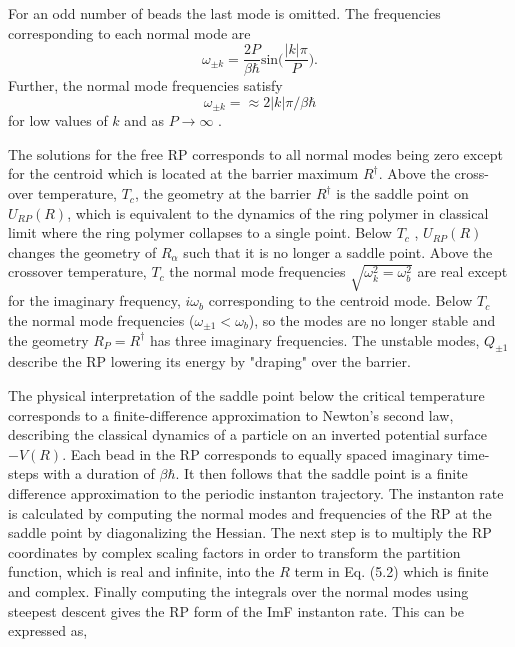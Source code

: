 \documentclass[phd,tocprelim]{cornell}
\begin{document}
For an odd number of beads the last mode is omitted. The frequencies corresponding to each normal mode are 
\begin{equation}
\omega_{\pm k} = \frac{2P}{\beta \hbar} \textrm{sin}\bigg( \frac{|k|\pi}{P} \bigg).
\end{equation}
Further, the normal mode frequencies satisfy 
\begin{equation}
\omega_{\pm k} = \approx 2|k|\pi/\beta \hbar
\end{equation}
 for low values of $k$ and as $P\to \infty$ . 
 
The solutions for the free RP corresponds to all normal modes being zero except for the centroid which is located at the barrier maximum $R^{\dagger}$.
 Above the cross-over temperature, $T_c$, the geometry at the barrier $R^{\dagger}$ is the saddle point on $U_{RP}(R)$, which is equivalent to the dynamics of the ring polymer in classical limit where the ring polymer collapses to a single point. Below $T_c$ , $U_{RP}(R)$ changes the geometry of $R_{\alpha}$ such that it is no longer a saddle point. Above the crossover temperature, $T_c$ the normal mode frequencies $\sqrt{\omega_k^2=\omega_b^2}$ are real except for the imaginary frequency, $i\omega_b$ corresponding to the centroid mode. Below $T_c$ the normal mode frequencies ($\omega_{\pm1}<\omega_b$), so the modes are no longer stable and the geometry $R_P= R^{\dagger}$ has three imaginary frequencies. The unstable modes, $Q_{\pm 1}$ describe the RP lowering its energy by "draping" over the barrier. 
 
 The physical interpretation of the saddle point below the critical temperature corresponds to a finite-difference approximation to Newton's second law, describing the classical dynamics of a particle on an inverted potential surface $-V(R)$. Each bead in the RP corresponds to equally spaced imaginary time-steps with a duration of $\beta \hbar$. It then follows that the saddle point is a finite difference approximation to the periodic instanton trajectory. The instanton rate is calculated by computing the normal modes and frequencies of the RP at the saddle point by diagonalizing the Hessian. The next step is to multiply the RP coordinates by complex scaling factors in order to transform the partition function, which is real and infinite, into the $R$ term in Eq. (5.2) which is finite and complex. Finally computing the integrals over the normal modes using steepest descent gives the RP form of the ImF instanton rate. This can be expressed as, 
 
\end{document}
